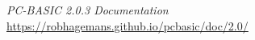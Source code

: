 \begin{itemlist}
\item \emph{PC-BASIC 2.0.3 Documentation} \\ \url{https://robhagemans.github.io/pcbasic/doc/2.0/}
\end{itemlist}
